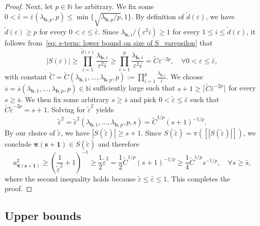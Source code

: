 \documentclass[namedate,webpdf]{ima-authoring-template-blank}
\newcommand{\abs}[1]{\left|#1\right|}
\newcommand{\absd}[1]{|#1|}    %
\numberwithin{counter}{section}
\numberwithin{equation}{section}
\theoremstyle{plain}
\theoremstyle{definition}
\newcommand*{\bbN}{\mathbb{N}}
\newcommand*{\wtC}{\widetilde{C}}
\newcommand*{\wtd}{\widetilde{d}}
\theoremstyle{thmstyletwo}
\begin{document}
\begin{proof}
    Next, let \(p \in \bbN\) be arbitrary. We fix some \(0 < \bar{\varepsilon} = \bar{\varepsilon}(\lambda_{\bm{b}, p}, p) \leq \min\{ \sqrt{\lambda_{\bm{b}, p}/p}, 1 \}\). By definition of \(\wtd(\varepsilon)\), we have \(\wtd(\varepsilon) \geq p\) for every \(0 < \varepsilon \leq \bar{\varepsilon}\). Since \(\lambda_{\bm{b}, i}/(\varepsilon^2 i) \geq 1\) for every \(1 \leq i \leq \wtd(\varepsilon)\), it follows from~\eqref{eq: s-term: lower bound on size of S_varepsilon} that
    \[
    \abs{S(\varepsilon)} 
    \geq \prod_{i = 1}^{\wtd(\varepsilon)} \frac{\lambda_{\bm{b}, i}}{\varepsilon^2 i} 
    \geq \prod_{i = 1}^{p} \frac{\lambda_{\bm{b}, i}}{\varepsilon^2 i} 
    = \wtC \varepsilon^{-2p},
    \quad \forall 0 < \varepsilon \leq \bar{\varepsilon},
    \]
    with constant 
    \(
    \wtC 
    = \wtC(\lambda_{\bm{b}, 1}, \dots, \lambda_{\bm{b}, p}, p) 
    := \prod_{i = 1}^p \frac{\lambda_{\bm{b}, i}}{i}.
    \)
    We choose \(\bar{s} = \bar{s}(\lambda_{\bm{b}, 1}, \dots, \lambda_{\bm{b}, p}, p) \in \bbN\) sufficiently large such that \(s + 1 \geq \lceil \wtC \bar{\varepsilon}^{-2 p} \rceil\) for every \(s \geq \bar{s}\). We then fix some arbitrary \(s \geq \bar{s}\) and pick \(0 < \widetilde{\varepsilon}\leq \bar{\varepsilon}\) such that 
    \(
    \wtC \widetilde{\varepsilon}^{-2p} = s + 1.
    \)
    Solving for \(\widetilde{\varepsilon}^2\) yields
    \[
    \widetilde{\varepsilon}^2 
    = \widetilde{\varepsilon}^2 (\lambda_{\bm{b}, 1}, \dots, \lambda_{\bm{b}, p}, p, s) 
    = \wtC^{1/p} (s + 1)^{-1/p}.
    \]
    By our choice of \(\widetilde{\varepsilon}\), we have \(\absd{S(\widetilde{\varepsilon})} \geq s + 1\). Since \(S(\widetilde{\varepsilon}) = \pi([\absd{S(\widetilde{\varepsilon})}])\), we conclude \(\bm{\pi(s + 1)} \in S(\widetilde{\varepsilon})\) and therefore
    \[
    u_{\bm{\pi(s+1)}}^2 
    \geq \left(\frac{1}{\widetilde{\varepsilon}^2} + 1\right)^{-1} 
    \geq \frac{1}{2}\widetilde{\varepsilon}^2 
    = \frac{1}{2} \wtC^{1/p} (s+1)^{-1/p}
    \geq \frac{1}{4} \wtC^{1/p} s^{-1/p}, 
    \quad \forall s \geq \bar{s},
    \]
    where the second inequality holds because \(\widetilde{\varepsilon} \leq \bar{\varepsilon} \leq 1\). This completes the proof.
\end{proof}



\subsection{Upper bounds}
\label{subsec: s-term: upper bounds}
\end{document}
